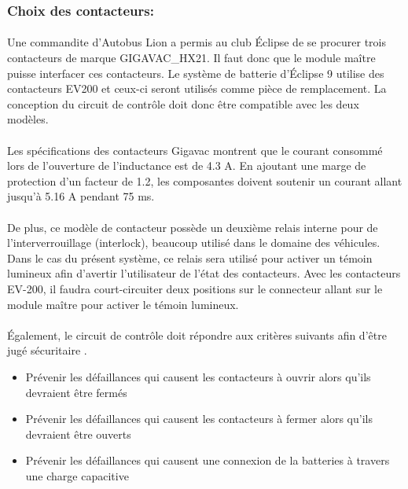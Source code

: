 	\subsubsection*{Choix des contacteurs:}
		\paragraph*{}
		Une commandite d'Autobus Lion a permis au club Éclipse de se procurer trois contacteurs de marque GIGAVAC\_HX21. Il faut donc que le module maître puisse interfacer ces contacteurs. Le système de batterie d'Éclipse 9 utilise des contacteurs EV200 et ceux-ci seront utilisés comme pièce de remplacement. La conception du circuit de contrôle doit donc être compatible avec les deux modèles.

		\paragraph*{}
		Les spécifications des contacteurs Gigavac montrent que le courant consommé lors de l'ouverture de l'inductance est de 4.3 A. En ajoutant une marge de protection d'un facteur de 1.2, les composantes doivent soutenir un courant allant jusqu'à 5.16 A pendant 75 ms\cite{GigavacHX21}. 

		\paragraph*{}
		De plus, ce modèle de contacteur possède un deuxième relais interne pour de l'interverrouillage (interlock), beaucoup utilisé dans le domaine des véhicules. Dans le cas du présent système, ce relais sera utilisé pour activer un témoin lumineux afin d'avertir l'utilisateur de l'état des contacteurs. Avec les contacteurs EV-200, il faudra court-circuiter deux positions sur le connecteur allant sur le module maître pour activer le témoin lumineux.

		\paragraph*{}
		Également, le circuit de contrôle doit répondre aux critères suivants afin d'être jugé sécuritaire \cite{System_Approach}.

		\begin{itemize}
			\item Prévenir les défaillances qui causent les contacteurs à ouvrir alors qu'ils devraient être fermés
			\item Prévenir les défaillances qui causent les contacteurs à fermer alors qu'ils devraient être ouverts
			\item Prévenir les défaillances qui causent une connexion de la batteries à travers une charge capacitive	
		\end{itemize}


